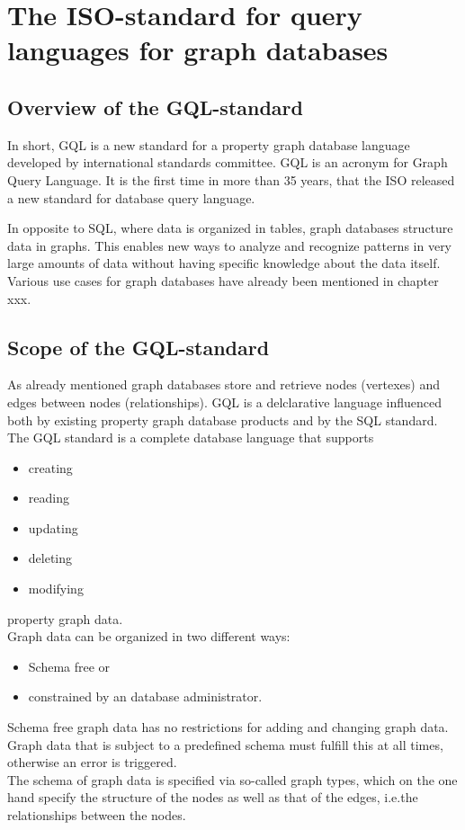 \chapter{The ISO-standard for query languages for graph databases}
\section{Overview of the GQL-standard}
In short, GQL is a new standard for a property graph database language developed by 
international standards committee.
GQL is an acronym for Graph Query Language.
It is the first time in more than 35 years, that the ISO released a new 
standard for database query language.

In opposite to SQL, where data is organized in tables, graph databases structure data in graphs. 
This enables new ways to analyze and recognize patterns in very large amounts of 
data without having specific knowledge about the data itself.
Various use cases for graph databases have already been mentioned in chapter xxx.
\section{Scope of the GQL-standard}
As already mentioned graph databases store and retrieve nodes (vertexes) and
edges between nodes (relationships). GQL is a delclarative language influenced both by 
existing property graph database products and by the SQL standard.
The GQL standard is a complete database language that supports
\begin{itemize}
	\item creating
	\item reading
	\item updating
	\item deleting
	\item modifying
\end{itemize}
property graph data. \\
Graph data can be organized in two different ways:
\begin{itemize}
    \item Schema free or
    \item constrained by an database administrator.
\end{itemize}
Schema free graph data has no restrictions for adding and changing graph data.
Graph data that is subject to a predefined schema must fulfill this at all times, 
otherwise an error is triggered.\\
The schema of graph data is specified via so-called graph types, 
which on the one hand specify the structure of the nodes as well as that of the edges, 
i.e.the relationships between the nodes.
